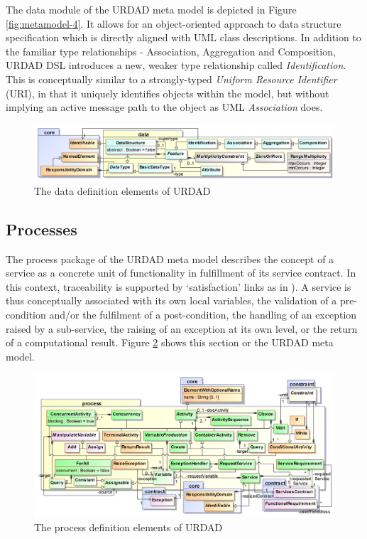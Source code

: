 The data module of the URDAD meta model is depicted in Figure \ref{fig:metamodel-4}. It allows for an object-oriented approach to data structure specification which is directly aligned with UML class descriptions. In addition to the familiar type relationships - Association, Aggregation and Composition, URDAD DSL introduces a new, weaker type relationship called \emph{Identification}. This is conceptually similar to a strongly-typed \emph{Uniform Resource Identifier} (URI), in that it uniquely identifies objects within the model, but without implying an active message path to the object as UML \emph{Association} does.
 
\begin{figure}[Htbp]
  \centering
  \includegraphics{data}
  \caption{The data definition elements of URDAD}
  \label{fig:dataStructureModule}
\end{figure}

\subsection{Processes}

The process package of the URDAD meta model describes the concept of a service as a concrete unit of functionality in fulfillment of its service contract. In this context, traceability is supported by `satisfaction' links as in \cite{ramesh_toward_2001}). A service is thus conceptually associated with its own local variables, the validation of a pre-condition and/or the fulfilment of a post-condition, the handling of an exception raised by a sub-service, the raising of an exception at its own level, or the return of a computational result. Figure \ref{fig:processModule} shows this section or the URDAD meta model.
\begin{figure}[Htbp]
  \centering
  \includegraphics{process}
  \caption{The process definition elements of URDAD}
  \label{fig:processModule}
\end{figure}

